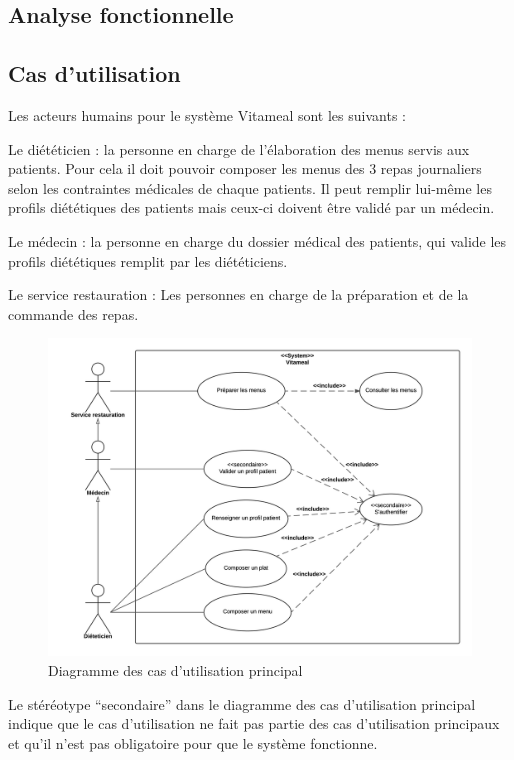 \textcolor[RGB]{46, 116, 181}{\chapter{Analyse fonctionnelle}}

\section{Cas d'utilisation}

Les acteurs humains pour le système Vitameal sont les suivants :

Le diététicien : la personne en charge de l'élaboration des menus servis aux patients. Pour cela il doit pouvoir composer les menus des 3 repas journaliers selon les contraintes médicales de chaque patients. Il peut remplir lui-même les profils diététiques des patients mais ceux-ci doivent être validé par un médecin.

Le médecin : la personne en charge du dossier médical des patients, qui valide les profils diététiques remplit par les diététiciens.
 
Le service restauration : Les personnes en charge de la préparation et de la commande des repas.

\begin{figure}[H]
\centering
\includegraphics[scale=0.8]{../../CasDUtilisations/diagramme_cas_utilisation.png}
\caption{Diagramme des cas d'utilisation principal}
\end{figure}

Le stéréotype ``secondaire'' dans le diagramme des cas d'utilisation principal indique que le cas d'utilisation ne fait pas partie des cas d'utilisation principaux et qu'il n'est pas obligatoire pour que le système fonctionne.


